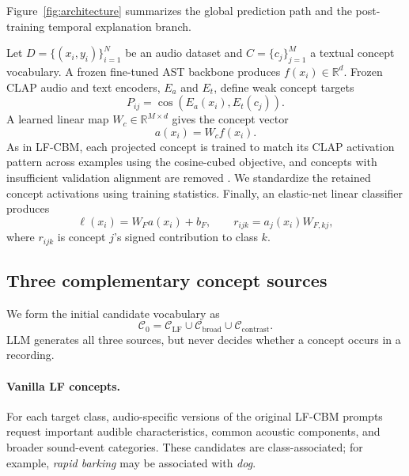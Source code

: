 \documentclass[10pt]{article}
\newcommand{\R}{\mathbb{R}}
\begin{document}
Figure~\ref{fig:architecture} summarizes the global prediction path and the post-training temporal explanation branch.

Let $D=\{(x_i,y_i)\}_{i=1}^{N}$ be an audio dataset and $C=\{c_j\}_{j=1}^{M}$ a textual concept vocabulary. A frozen fine-tuned AST backbone produces $f(x_i)\in\R^d$. Frozen CLAP audio and text encoders, $E_a$ and $E_t$, define weak concept targets
\begin{equation}
P_{ij}=\cos\!\left(E_a(x_i),E_t(c_j)\right).
\label{eq:clap}
\end{equation}
A learned linear map $W_c\in\R^{M\times d}$ gives the concept vector
\begin{equation}
a(x_i)=W_cf(x_i).
\label{eq:concept}
\end{equation}
As in LF-CBM, each projected concept is trained to match its CLAP activation pattern across examples using the cosine-cubed objective, and concepts with insufficient validation alignment are removed \citep{oikarinen2023labelfree}. We standardize the retained concept activations using training statistics. Finally, an elastic-net linear classifier produces
\begin{equation}
\ell(x_i)=W_Fa(x_i)+b_F,
\qquad r_{ijk}=a_j(x_i)W_{F,kj},
\label{eq:head}
\end{equation}
where $r_{ijk}$ is concept $j$'s signed contribution to class $k$.

\subsection{Three complementary concept sources}
We form the initial candidate vocabulary as
\begin{equation}
\mathcal C_0=\mathcal C_{\mathrm{LF}}\cup\mathcal C_{\mathrm{broad}}\cup\mathcal C_{\mathrm{contrast}}.
\end{equation}
LLM generates all three sources, but never decides whether a concept occurs in a recording.

\paragraph{Vanilla LF concepts.}
For each target class, audio-specific versions of the original LF-CBM prompts request important audible characteristics, common acoustic components, and broader sound-event categories. These candidates are class-associated; for example, \emph{rapid barking} may be associated with \emph{dog}.
\end{document}
